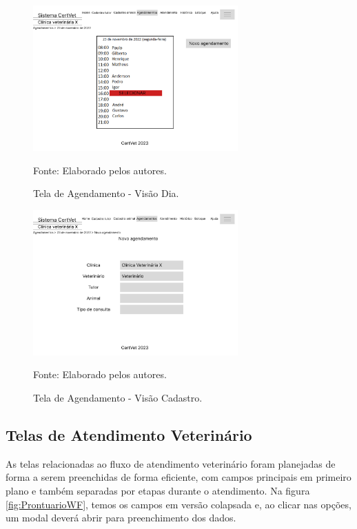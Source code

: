\documentclass[
    12pt,               %
    openright,          %
    oneside,
    a4paper,            %
    BIBLATEX,           %
    TODO,               %
    english,            %
    brazil              %
    ]{ifsp-spo-inf-ctds}
\begin{document}
\begin{figure}[H]
                \centering
                \caption{Tela de Agendamento - Visão Dia.}
                \includegraphics[width=0.7\textwidth]{images/Telas/Tela Marcar Agenda.png}
                
                \label{fig:Agenda}
                \centering
        {\footnotesize Fonte: Elaborado pelos autores.}
            \end{figure}    


\begin{figure}[H]
                \centering
                \caption{Tela de Agendamento - Visão Cadastro.}
                \includegraphics[width=0.7\textwidth]{images/Telas/Tela Marcar Agenda2.png}
                
                \label{fig:Agenda2}
                \centering
        {\footnotesize Fonte: Elaborado pelos autores.}
            \end{figure}    

    \subsection{Telas de Atendimento Veterinário}

As telas relacionadas ao fluxo de atendimento veterinário foram planejadas de forma a serem preenchidas de forma eficiente, com campos principais em primeiro plano e também separadas por etapas durante o atendimento. Na figura \ref{fig:ProntuarioWF}, temos os campos em versão colapsada e, ao clicar nas opções, um modal deverá abrir para preenchimento dos dados. 
\end{document}
